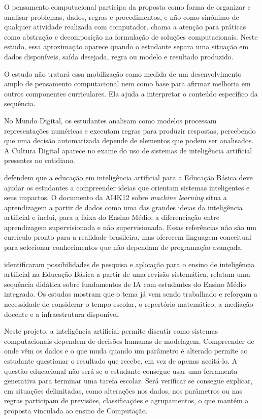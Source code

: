 O pensamento computacional participa da proposta como forma de organizar e analisar problemas, dados, regras e procedimentos, e não como sinônimo de qualquer atividade realizada com computador.  chama a atenção para práticas como abstração e decomposição na formulação de soluções computacionais. Neste estudo, essa aproximação aparece quando o estudante separa uma situação em dados disponíveis, saída desejada, regra ou modelo e resultado produzido.

O estudo não tratará essa mobilização como medida de um desenvolvimento amplo de pensamento computacional nem como base para afirmar melhoria em outros componentes curriculares. Ela ajuda a interpretar o conteúdo específico da sequência.

No Mundo Digital, os estudantes analisam como modelos processam representações numéricas e executam regras para produzir respostas, percebendo que uma decisão automatizada depende de elementos que podem ser analisados. A Cultura Digital aparece no exame do uso de sistemas de inteligência artificial presentes no cotidiano.

 defendem que a educação em inteligência artificial para a Educação Básica deve ajudar os estudantes a compreender ideias que orientam sistemas inteligentes e seus impactos. O documento da AI4K12 sobre \textit{machine learning} \cite{touretzky2023machine} situa a aprendizagem a partir de dados como uma das grandes ideias da inteligência artificial e inclui, para a faixa do Ensino Médio, a diferenciação entre aprendizagem supervisionada e não supervisionada. Essas referências não são um currículo pronto para a realidade brasileira, mas oferecem linguagem conceitual para selecionar conhecimentos que não dependam de programação avançada.

 identificaram possibilidades de pesquisa e aplicação para o ensino de inteligência artificial na Educação Básica a partir de uma revisão sistemática.  relatam uma sequência didática sobre fundamentos de IA com estudantes do Ensino Médio integrado. Os estudos mostram que o tema já vem sendo trabalhado e reforçam a necessidade de considerar o tempo escolar, o repertório matemático, a mediação docente e a infraestrutura disponível.

Neste projeto, a inteligência artificial permite discutir como sistemas computacionais dependem de decisões humanas de modelagem. Compreender de onde vêm os dados e o que muda quando um parâmetro é alterado permite ao estudante questionar o resultado que recebe, em vez de apenas aceitá-lo. A questão educacional não será se o estudante consegue usar uma ferramenta generativa para terminar uma tarefa escolar. Será verificar se consegue explicar, em situações delimitadas, como alterações nos dados, nos parâmetros ou nas regras participam de previsões, classificações e agrupamentos, o que mantém a proposta vinculada ao ensino de Computação.

